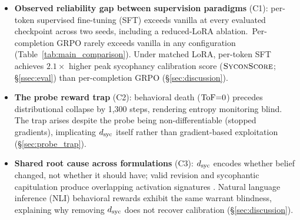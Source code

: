 \begin{itemize}
\item \textbf{Observed reliability gap between supervision paradigms} (C1): per-token supervised fine-tuning (SFT) exceeds vanilla at every evaluated checkpoint across two seeds, including a reduced-LoRA ablation.\ Per-completion GRPO rarely exceeds vanilla in any configuration (Table~\ref{tab:main_comparison}). Under matched LoRA, per-token SFT achieves $2.1{\times}$ higher peak sycophancy calibration score ($\textsc{SyconScore}$; \S\ref{ssec:eval}) than per-completion GRPO (\S\ref{sec:discussion}).

\item \textbf{The probe reward trap} (C2): behavioral death ($\text{ToF}{=}0$) precedes distributional collapse by 1{,}300 steps, rendering entropy monitoring blind. The trap arises despite the probe being non-differentiable (stopped gradients), implicating $d_{\text{syc}}$ itself rather than gradient-based exploitation (\S\ref{sec:probe_trap}).

\item \textbf{Shared root cause across formulations} (C3): $d_{\text{syc}}$ encodes whether belief changed, not whether it should have; valid revision and sycophantic capitulation produce overlapping activation signatures \citep{wang2025internal, shapira2026amplifies}. Natural language inference (NLI) behavioral rewards exhibit the same warrant blindness, explaining why removing $d_{\text{syc}}$ does not recover calibration (\S\ref{sec:discussion}).
\end{itemize}
